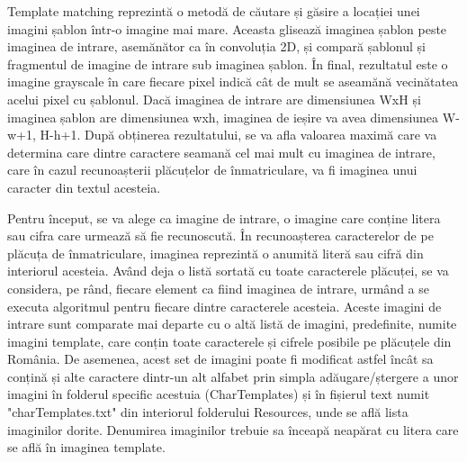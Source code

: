 \documentclass[12pt]{article}
\begin{document}
Template matching reprezint\u{a} o metod\u{a} de c\u{a}utare și g\u{a}sire a locației unei imagini șablon \^{i}ntr-o imagine mai mare. Aceasta gliseaz\u{a} imaginea șablon peste imaginea de intrare, asem\u{a}n\u{a}tor ca \^{i}n convoluția 2D, și compar\u{a} șablonul și fragmentul de imagine de intrare sub imaginea șablon. \^{I}n final, rezultatul este o imagine grayscale \^{i}n care fiecare pixel indic\u{a} c\^{a}t de mult se aseam\u{a}n\u{a} vecin\u{a}tatea acelui pixel cu șablonul. Dac\u{a} imaginea de intrare are dimensiunea WxH și imaginea șablon are dimensiunea wxh, imaginea de ieșire va avea dimensiunea W-w+1, H-h+1. Dup\u{a} obținerea rezultatului, se va afla valoarea maxim\u{a} care va determina care dintre caractere seaman\u{a} cel mai mult cu imaginea de intrare, care \^{i}n cazul recunoașterii pl\u{a}cuțelor de \^{i}nmatriculare, va fi imaginea unui caracter din textul acesteia.

Pentru \^{i}nceput, se va alege ca imagine de intrare, o imagine care conține litera sau cifra care urmeaz\u{a} s\u{a} fie recunoscut\u{a}.  \^{I}n recunoașterea caracterelor de pe pl\u{a}cuța de \^{i}nmatriculare, imaginea reprezint\u{a} o anumit\u{a} liter\u{a} sau cifr\u{a} din interiorul acesteia. Av\^{a}nd deja o list\u{a} sortat\u{a} cu toate caracterele pl\u{a}cuței, se va considera, pe r\^{a}nd, fiecare element ca fiind imaginea de intrare, urm\^{a}nd a se executa algoritmul pentru fiecare dintre caracterele acesteia. Aceste imagini de intrare sunt comparate mai departe cu o alt\u{a} list\u{a} de imagini, predefinite, numite imagini template, care conțin toate caracterele și cifrele posibile pe pl\u{a}cuțele din Rom\^{a}nia. De asemenea, acest set de imagini poate fi modificat astfel \^{i}nc\^{a}t sa conțin\u{a} și alte caractere dintr-un alt alfabet prin simpla ad\u{a}ugare/ștergere a unor imagini \^{i}n folderul specific acestuia (CharTemplates) și \^{i}n fișierul text numit "charTemplates.txt" din interiorul folderului Resources, unde se afl\u{a} lista imaginilor dorite. Denumirea imaginilor trebuie sa \^{i}nceap\u{a} neap\u{a}rat cu litera care se afl\u{a} \^{i}n imaginea template.
\end{document}
